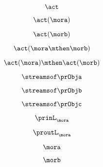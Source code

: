 \begin{forslides}
    \begin{equation}
        \label{eq:slides-processes-45}
        \act
    \end{equation}

    \begin{equation}
        \label{eq:slides-processes-46}
        \act(\mora)
    \end{equation}

    \begin{equation}
        \label{eq:slides-processes-47}
        \act(\morb)
    \end{equation}

    \begin{equation}
        \label{eq:slides-processes-48}
        \act(\mora \mthen \morb)
    \end{equation}

    \begin{equation}
        \label{eq:slides-processes-49}
        \act(\mora) \mthen \act(\morb)
    \end{equation}

    \begin{equation}
        \label{eq:slides-processes-50}
        \streamsof \prObja
    \end{equation}

    \begin{equation}
        \label{eq:slides-processes-51}
        \streamsof \prObjb
    \end{equation}

    \begin{equation}
        \label{eq:slides-processes-52}
        \streamsof \prObjc
    \end{equation}

    \begin{equation}
        \label{eq:slides-processes-53}
        \prinL_\mora
    \end{equation}

    \begin{equation}
        \label{eq:slides-processes-54}
        \proutL_\mora
    \end{equation}

    \begin{equation}
        \label{eq:slides-processes-55}
        \mora
    \end{equation}

    \begin{equation}
        \label{eq:slides-processes-56}
        \morb
    \end{equation}


\end{forslides}
